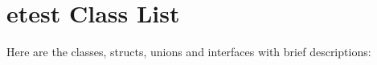\section{etest Class List}
Here are the classes, structs, unions and interfaces with brief descriptions:\begin{CompactList}
\item{}
\item{}
\end{CompactList}

